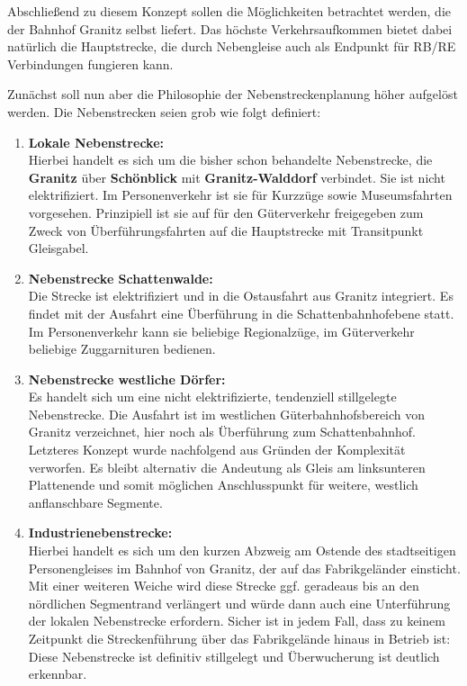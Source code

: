 Abschlie{\ss}end zu diesem Konzept sollen die M\"oglichkeiten betrachtet werden, die der Bahnhof Granitz selbst liefert.
Das h\"ochste Verkehrsaufkommen bietet dabei nat\"urlich die Hauptstrecke, die durch Nebengleise auch als Endpunkt f\"ur RB/RE Verbindungen fungieren kann.

Zun\"achst soll nun aber die Philosophie der Nebenstreckenplanung h\"oher aufgel\"ost werden.
Die Nebenstrecken seien grob wie folgt definiert:
\begin{enumerate}
	\item \textbf{Lokale Nebenstrecke:}\\
	Hierbei handelt es sich um die bisher schon behandelte Nebenstrecke, die \textbf{Granitz} \"uber \textbf{Sch\"onblick} mit \textbf{Granitz-Walddorf} verbindet.
	Sie ist nicht elektrifiziert.
	Im Personenverkehr ist sie f\"ur Kurzz\"uge sowie Museumsfahrten vorgesehen.
	Prinzipiell ist sie auf f\"ur den G\"uterverkehr freigegeben zum Zweck von \"Uberf\"uhrungsfahrten auf die Hauptstrecke mit Transitpunkt Gleisgabel.
	\item \textbf{Nebenstrecke Schattenwalde:}\\
	Die Strecke ist elektrifiziert und in die Ostausfahrt aus Granitz integriert.
	Es findet mit der Ausfahrt eine \"Uberf\"uhrung in die Schattenbahnhofebene statt.
	Im Personenverkehr kann sie beliebige Regionalz\"uge, im G\"uterverkehr beliebige Zuggarnituren bedienen.
	\item \textbf{Nebenstrecke westliche D\"orfer:}\\
	Es handelt sich um eine nicht elektrifizierte, tendenziell stillgelegte Nebenstrecke.
	Die Ausfahrt ist im westlichen G\"uterbahnhofsbereich von Granitz verzeichnet, hier noch als \"Uberf\"uhrung zum Schattenbahnhof.
	Letzteres Konzept wurde nachfolgend aus Gr\"unden der Komplexit\"at verworfen.
	Es bleibt alternativ die Andeutung als Gleis am linksunteren Plattenende und somit m\"oglichen Anschlusspunkt f\"ur weitere, westlich anflanschbare Segmente.
	\item \textbf{Industrienebenstrecke:}\\
	Hierbei handelt es sich um den kurzen Abzweig am Ostende des stadtseitigen Personengleises im Bahnhof von Granitz, der auf das Fabrikgel\"ander einsticht.
	Mit einer weiteren Weiche wird diese Strecke ggf. geradeaus bis an den n\"ordlichen Segmentrand verl\"angert und w\"urde dann auch eine Unterf\"uhrung der lokalen Nebenstrecke erfordern.
	Sicher ist in jedem Fall, dass zu keinem Zeitpunkt die Streckenf\"uhrung \"uber das Fabrikgel\"ande hinaus in Betrieb ist:
	Diese Nebenstrecke ist definitiv stillgelegt und \"Uberwucherung ist deutlich erkennbar.
\end{enumerate}

